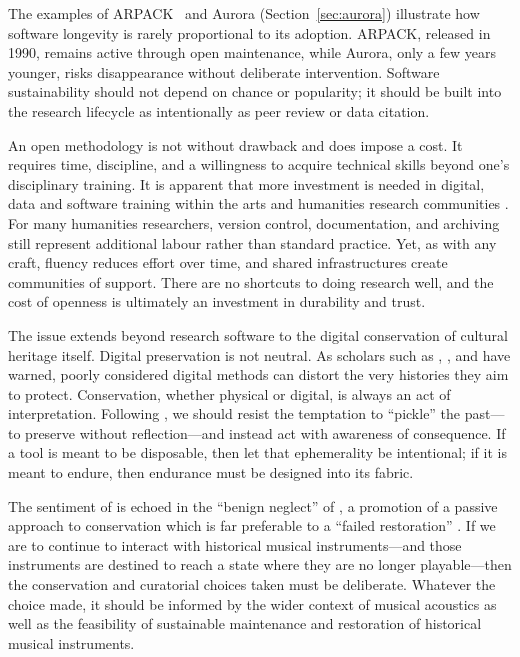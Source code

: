 The examples of ARPACK~\cite{lehoucq_arpack_1998} and Aurora (Section~\ref{sec:aurora}) illustrate how software longevity is rarely proportional to its adoption. ARPACK, released in 1990, remains active through open maintenance, while Aurora, only a few years younger, risks disappearance without deliberate intervention. Software sustainability should not depend on chance or popularity; it should be built into the research lifecycle as intentionally as peer review or data citation.



An open methodology is not without drawback and does impose a cost. It requires time, discipline, and a willingness to acquire technical skills beyond one's disciplinary training. 
It is apparent that more investment is needed in digital, data and software training within the arts and humanities research communities \cite{taylor_shaping_2022}.
For many humanities researchers, version control, documentation, and archiving still represent additional labour rather than standard practice. Yet, as with any craft, fluency reduces effort over time, and shared infrastructures create communities of support. There are no shortcuts to doing research well, and the cost of openness is ultimately an investment in durability and trust.

The issue extends beyond research software to the digital conservation of cultural heritage itself. Digital preservation is not neutral. As scholars such as \textcite{rubio_work_2020}, \textcite{schwarz_disk_2006}, and \textcite{parry_museums_2010} have warned, poorly considered digital methods can distort the very histories they aim to protect. Conservation, whether physical or digital, is always an act of interpretation. Following \textcite{desilvey_curated_2017}, we should resist the temptation to ``pickle'' the past---to preserve without reflection---and instead act with awareness of consequence. If a tool is meant to be disposable, then let that ephemerality be intentional; if it is meant to endure, then endurance must be designed into its fabric.

The sentiment of \citeauthor{desilvey_curated_2017} is echoed in the ``benign neglect''  of \textcite[p. 75--76]{barclay_preservation_2005}, a promotion of a passive approach to conservation which is far preferable to a ``failed restoration'' \cite[p.\ 244]{barclay_preservation_2005}.
If we are to continue to interact with historical musical instruments---and those instruments are destined to reach a state where they are no longer playable---then the conservation and curatorial choices taken must be deliberate. Whatever the choice made, it should be informed by the wider context of musical acoustics as well as the feasibility of sustainable maintenance and restoration of historical musical instruments.

